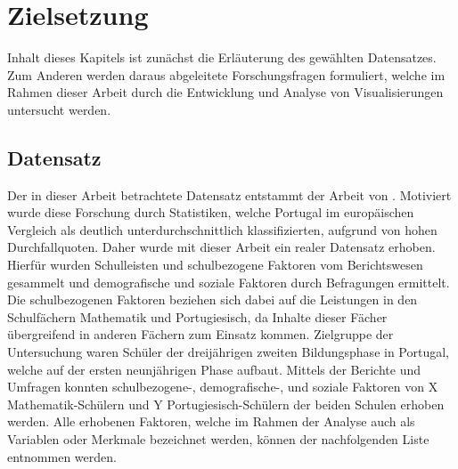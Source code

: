 \chapter[Zielsetzung]{Zielsetzung}

Inhalt dieses Kapitels ist zunächst die Erläuterung des gewählten Datensatzes.
Zum Anderen werden daraus abgeleitete Forschungsfragen formuliert, welche im Rahmen dieser Arbeit durch die Entwicklung und Analyse von Visualisierungen untersucht werden. 

\section[Untersuchter Datensatz]{Datensatz}

Der in dieser Arbeit betrachtete Datensatz entstammt der Arbeit von \cite[]{Cortez2008UsingDM}.
Motiviert wurde diese Forschung durch Statistiken, welche Portugal im europäischen Vergleich als deutlich unterdurchschnittlich klassifizierten, aufgrund von hohen Durchfallquoten. \cite[S. 1]{Cortez2008UsingDM}
Daher wurde mit dieser Arbeit ein realer Datensatz erhoben.
Hierfür wurden Schulleisten und schulbezogene Faktoren vom Berichtswesen gesammelt und demografische und soziale Faktoren durch Befragungen ermittelt. \cite[S. 1]{Cortez2008UsingDM}
Die schulbezogenen Faktoren beziehen sich dabei auf die Leistungen in den Schulfächern Mathematik und Portugiesisch, da Inhalte dieser Fächer übergreifend in anderen Fächern zum Einsatz kommen. \cite[S. 2]{Cortez2008UsingDM}
Zielgruppe der Untersuchung waren Schüler der dreijährigen zweiten Bildungsphase in Portugal, welche auf der ersten neunjährigen Phase aufbaut. \cite[S. 2]{Cortez2008UsingDM}
Mittels der Berichte und Umfragen konnten schulbezogene-, demografische-, und soziale Faktoren von X Mathematik-Schülern und Y Portugiesisch-Schülern der beiden Schulen erhoben werden.
Alle erhobenen Faktoren, welche im Rahmen der Analyse auch als Variablen oder Merkmale bezeichnet werden, können der nachfolgenden Liste entnommen werden. 

